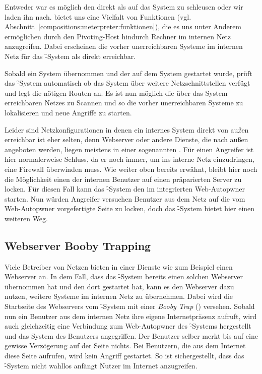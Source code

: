 Entweder war es möglich den  direkt als  auf das System
zu schleusen oder wir laden ihn nach.  bietet uns eine Vielfalt von
Funktionen (vgl. Abschnitt~\ref{compositions:meterpreter:funktionen}), die es
uns unter Anderem ermöglichen durch den Pivoting-Host hindurch Rechner im internen
Netz anzugreifen. Dabei erscheinen die vorher unerreichbaren Systeme im internen
Netz für das \f-System als direkt erreichbar.

Sobald ein System übernommen und der  auf dem System
gestartet wurde, prüft das \f-System automatisch ob das System über weitere
Netzschnittstellen verfügt und legt die nötigen Routen an. Es ist nun möglich
die über das System erreichbaren Netzes zu Scannen und so die vorher
unerreichbaren Systeme zu lokalisieren und neue Angriffe zu starten.

Leider sind Netzkonfigurationen in denen ein internes System direkt von außen
erreichbar ist eher selten, denn Webserver oder andere Dienste, die nach außen
angeboten werden, liegen meistens in einer sogenannten . Für einen
Angreifer ist hier normalerweise Schluss, da er noch immer, um ins interne
Netz einzudringen, eine Firewall überwinden muss.
Wie weiter oben bereits erwähnt, bleibt hier noch die Möglichkeit einen der
internen Benutzer auf einen präparierten Server zu locken. Für diesen Fall
kann das \f-System den im  integrierten Web-Autopwner starten. Nun
würden Angreifer versuchen Benutzer aus dem Netz auf die vom Web-Autopwner
vorgefertigte Seite zu locken, doch das \f-System bietet hier einen
weiteren Weg.

\subsection{Webserver Booby Trapping}

Viele Betreiber von Netzen bieten in einer  Dienste wie zum Beispiel
einen Webserver an. In dem Fall, dass das \f-System bereits einen solchen
Webserver übernommen hat und den  dort gestartet hat, kann es den
Webserver dazu nutzen, weitere Systeme im internen Netz zu übernehmen. Dabei
wird die Startseite des Webservers vom \f-System mit einer \textit{Booby
Trap} (\su) versehen. Sobald nun ein Benutzer aus dem
internen Netz ihre eigene Internetpräsenz aufruft, wird auch gleichzeitig eine
Verbindung zum Web-Autopwner des \f-Systems hergestellt und das System des
Benutzers angegriffen. Der Benutzer selber merkt bis auf eine gewisse
Verzögerung auf der Seite nichts. Bei Benutzern, die aus dem Internet diese
Seite aufrufen, wird kein Angriff gestartet. So ist sichergestellt, dass das
\f-System nicht wahllos anfängt Nutzer im Internet anzugreifen.

